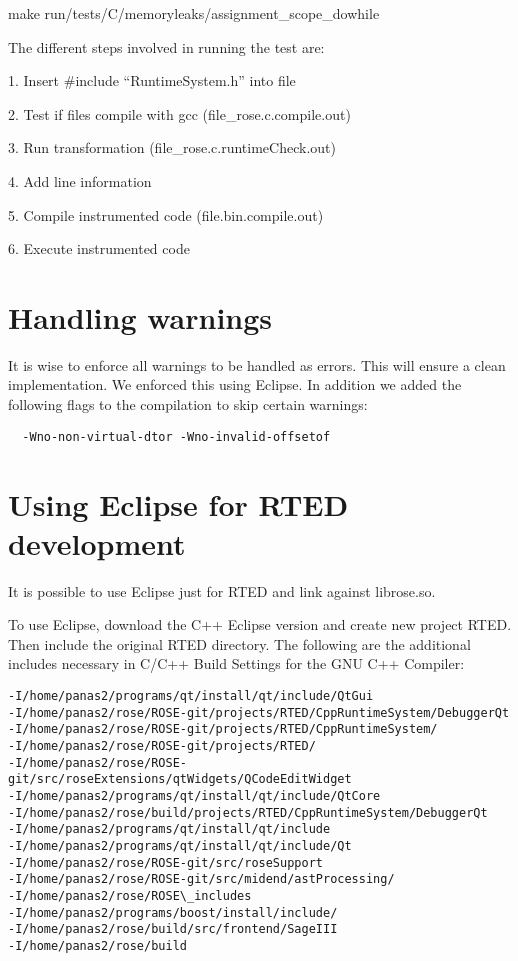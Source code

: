   make run/tests/C/memoryleaks/assignment\_scope\_dowhile

The different steps involved in running the test are:

1. Insert \#include ``RuntimeSystem.h'' into file

2. Test if files compile with gcc (file\_rose.c.compile.out)

3. Run transformation (file\_rose.c.runtimeCheck.out)

4. Add line information

5. Compile instrumented code (file.bin.compile.out)

6. Execute instrumented code



\section{Handling warnings}

It is wise to enforce all warnings to be handled as errors. This will ensure a clean implementation. We enforced this using Eclipse.
In addition we added the following flags to the compilation to skip certain warnings:

\begin{verbatim}
  -Wno-non-virtual-dtor -Wno-invalid-offsetof 
\end{verbatim}

\section{Using Eclipse for RTED development}

It is possible to use Eclipse just for RTED and link against librose.so.

To use Eclipse, download the C++ Eclipse version and create new project RTED.
Then include the original RTED directory. The following are the additional includes necessary in C/C++ Build Settings for the GNU C++ Compiler:

\begin{verbatim}
-I/home/panas2/programs/qt/install/qt/include/QtGui 
-I/home/panas2/rose/ROSE-git/projects/RTED/CppRuntimeSystem/DebuggerQt 
-I/home/panas2/rose/ROSE-git/projects/RTED/CppRuntimeSystem/ 
-I/home/panas2/rose/ROSE-git/projects/RTED/ 
-I/home/panas2/rose/ROSE-git/src/roseExtensions/qtWidgets/QCodeEditWidget 
-I/home/panas2/programs/qt/install/qt/include/QtCore 
-I/home/panas2/rose/build/projects/RTED/CppRuntimeSystem/DebuggerQt 
-I/home/panas2/programs/qt/install/qt/include 
-I/home/panas2/programs/qt/install/qt/include/Qt 
-I/home/panas2/rose/ROSE-git/src/roseSupport 
-I/home/panas2/rose/ROSE-git/src/midend/astProcessing/ 
-I/home/panas2/rose/ROSE\_includes 
-I/home/panas2/programs/boost/install/include/ 
-I/home/panas2/rose/build/src/frontend/SageIII 
-I/home/panas2/rose/build 
\end{verbatim}


